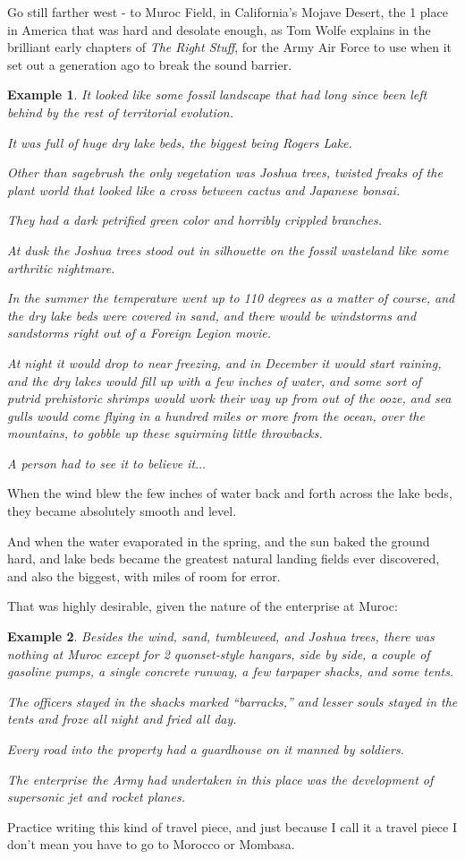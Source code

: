 \documentclass{book}
\numberwithin{equation}{section}
\newtheorem{example}{Example}[chapter]
\begin{document}
%
Go still farther west - to Muroc Field, in California's Mojave Desert, the 1 place in America that was hard and desolate enough, as Tom Wolfe explains in the brilliant early chapters of \textit{The Right Stuff}, for the Army Air Force to use when it set out a generation ago to break the sound barrier.
\begin{example}
    It looked like some fossil landscape that had long since been left behind by the rest of territorial evolution.
    
    It was full of huge dry lake beds, the biggest being Rogers Lake.
    
    Other than sagebrush the only vegetation was Joshua trees, twisted freaks of the plant world that looked like a cross between cactus and Japanese bonsai.
    
    They had a dark petrified green color and horribly crippled branches.
    
    At dusk the Joshua trees stood out in silhouette on the fossil wasteland like some arthritic nightmare.
    
    In the summer the temperature went up to 110 degrees as a matter of course, and the dry lake beds were covered in sand, and there would be windstorms and sandstorms right out of a Foreign Legion movie.
    
    At night it would drop to near freezing, and in December it would start raining, and the dry lakes would fill up with a few inches of water, and some sort of putrid prehistoric shrimps would work their way up from out of the ooze, and sea gulls would come flying in a hundred miles or more from the ocean, over the mountains, to gobble up these squirming little throwbacks.
    
    A person had to see it to believe it$\ldots$
\end{example}
When the wind blew the few inches of water back and forth across the lake beds, they became absolutely smooth and level.

And when the water evaporated in the spring, and the sun baked the ground hard, and lake beds became the greatest natural landing fields ever discovered, and also the biggest, with miles of room for error.

That was highly desirable, given the nature of the enterprise at Muroc:
\begin{example}
    Besides the wind, sand, tumbleweed, and Joshua trees, there was nothing at Muroc except for 2 quonset-style hangars, side by side, a couple of gasoline pumps, a single concrete runway, a few tarpaper shacks, and some tents.
    
    The officers stayed in the shacks marked ``barracks,'' and lesser souls stayed in the tents and froze all night and fried all day.
    
    Every road into the property had a guardhouse on it manned by soldiers.
    
    The enterprise the Army had undertaken in this  place was the development of supersonic jet and rocket planes.
\end{example}
Practice writing this kind of travel piece, and just because I call it a travel piece I don't mean you have to go to Morocco or Mombasa.
\end{document}
